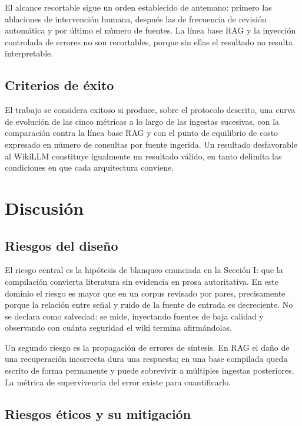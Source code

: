 \documentclass[11pt,letterpaper]{article}
\begin{document}
El alcance recortable sigue un orden establecido de antemano: primero las ablaciones de intervención
humana, después las de frecuencia de revisión automática y por último el número de fuentes. La línea
base RAG y la inyección controlada de errores no son recortables, porque sin ellas el resultado no
resulta interpretable.

\subsection{Criterios de éxito}

El trabajo se considera exitoso si produce, sobre el protocolo descrito, una curva de evolución de las
cinco métricas a lo largo de las ingestas sucesivas, con la comparación contra la línea base RAG y con
el punto de equilibrio de costo expresado en número de consultas por fuente ingerida. Un resultado
desfavorable al WikiLLM constituye igualmente un resultado válido, en tanto delimita las condiciones
en que cada arquitectura conviene.

\section{Discusión}

\subsection{Riesgos del diseño}

El riesgo central es la hipótesis de blanqueo enunciada en la Sección I: que la compilación convierta
literatura sin evidencia en prosa autoritativa. En este dominio el riesgo es mayor que en un corpus
revisado por pares, precisamente porque la relación entre señal y ruido de la fuente de entrada es
decreciente. No se declara como salvedad: se mide, inyectando fuentes de baja calidad y observando con
cuánta seguridad el wiki termina afirmándolas.

Un segundo riesgo es la propagación de errores de síntesis. En RAG el daño de una recuperación
incorrecta dura una respuesta; en una base compilada queda escrito de forma permanente y puede
sobrevivir a múltiples ingestas posteriores. La métrica de supervivencia del error existe para
cuantificarlo.

\subsection{Riesgos éticos y su mitigación}
\end{document}
